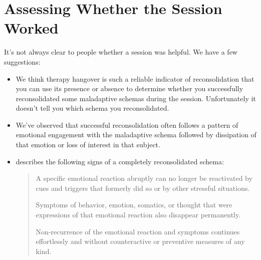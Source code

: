 \documentclass[12pt,letterpaper]{book}
\begin{document}
\section{Assessing Whether the Session Worked}
It's not always clear to people whether a session was helpful. We have a few suggestions:
\begin{itemize}
    \item We think therapy hangover is such a reliable indicator of reconsolidation that you can use its presence or absence to determine whether you successfully reconsolidated some maladaptive schemas during the session. Unfortunately it doesn't tell you which schema you reconsolidated.
    \item We've observed that successful reconsolidation often follows a pattern of emotional engagement with the maladaptive schema followed by dissipation of that emotion or loss of interest in that subject.
    \item \textcite{eckerUnlocking} describes the following signs of a completely reconsolidated schema:
    \begin{quotation}
        A specific emotional reaction abruptly can no longer be reactivated by cues and triggers that formerly did so or by other stressful situations.
        
        Symptoms of behavior, emotion, somatics, or thought that were expressions of that emotional reaction also disappear permanently.
        
        Non-recurrence of the emotional reaction and symptoms continues effortlessly and without counteractive or preventive measures of any kind.
    \end{quotation}
\end{itemize}
\end{document}
